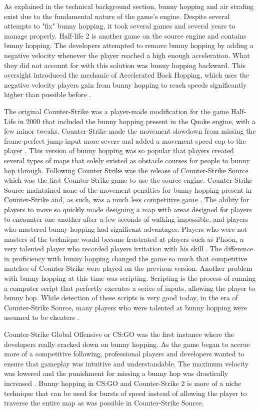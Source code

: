 \documentclass[10pt,twocolumn]{article}
\begin{document}
As explained in the technical background section, bunny hopping and air strafing exist due to the fundamental nature of the game's engine. Despite several attempts to "fix" bunny hopping, it took several games and several years to manage properly. Half-life 2 is another game on the source engine and contains bunny hopping. The developers attempted to remove bunny hopping by adding a negative velocity whenever the player reached a high enough acceleration. What they did not account for with this solution was bunny hopping backward. This oversight introduced the mechanic of Accelerated Back Hopping, which uses the negative velocity players gain from bunny hopping to reach speeds significantly higher than possible before \cite{ABH}.

The original Counter-Strike was a player-made modification for the game Half-Life in 2000 that included the bunny hopping present in the Quake engine, with a few minor tweaks. Counter-Strike made the movement slowdown from missing the frame-perfect jump input more severe and added a movement speed cap to the player \cite{bhopHistory}. This version of bunny hopping was so popular that players created several types of maps that solely existed as obstacle courses for people to bunny hop through. Following Counter Strike was the release of Counter-Strike Source which was the first Counter-Strike game to use the source engine\cite{bhopHistory}. Counter-Strike Source maintained none of the movement penalties for bunny hopping present in Counter-Strike and, as such, was a much less competitive game \cite{ExploringEsports}. The ability for players to move so quickly made designing a map with areas designed for players to encounter one another after a few seconds of walking impossible, and players who mastered bunny hopping had significant advantages. Players who were not masters of the technique would become frustrated at players such as Phoon, a very talented player who recorded players irritation with his skill \cite{phoon}. The difference in proficiency with bunny hopping changed the game so much that competitive matches of Counter-Strike were played on the previous version. Another problem with bunny hopping at this time was scripting. Scripting is the process of running a computer script that perfectly executes a series of inputs, allowing the player to bunny hop. While detection of these scripts is very good today, in the era of Counter-Strike Source, many players who were talented at bunny hopping were assumed to be cheaters \cite{bhopHistory}. 

Counter-Strike Global Offensive or CS:GO was the first instance where the developers really cracked down on bunny hopping. As the game began to accrue more of a competitive following, professional players and developers wanted to ensure that gameplay was intuitive and understandable. The maximum velocity was lowered and the punishment for missing a bunny hop was drastically increased \cite{HowToBhopCS2}. Bunny hopping in CS:GO and Counter-Strike 2 is more of a niche technique that can be used for bursts of speed instead of allowing the player to traverse the entire map as was possible in Counter-Strike Source.
\end{document}
